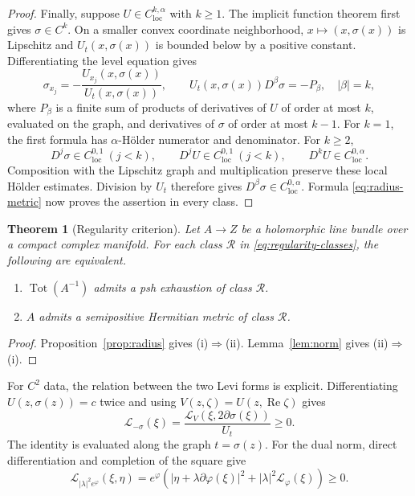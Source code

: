 \documentclass[11pt]{amsart}
\newtheorem{theorem}{Theorem}[section]
\theoremstyle{definition}
\theoremstyle{remark}
\numberwithin{equation}{section}
\newcommand{\Tot}{\operatorname{Tot}}
\newcommand{\Levi}{\mathcal L}
\begin{document}
\begin{proof}
Finally, suppose $U\in C^{k,\alpha}_{\mathrm{loc}}$ with $k\ge1$.
The implicit function theorem first gives $\sigma\in C^k$. On a smaller
convex coordinate neighborhood, $x\mapsto(x,\sigma(x))$ is
Lipschitz and $U_t(x,\sigma(x))$ is bounded below by a positive
constant. Differentiating the level equation gives
\[
 \sigma_{x_j}=-\frac{U_{x_j}(x,\sigma(x))}{U_t(x,\sigma(x))},
 \qquad
 U_t(x,\sigma(x))D^\beta\sigma=-P_\beta,
 \quad |\beta|=k,
\]
where $P_\beta$ is a finite sum of products of derivatives of $U$
of order at most $k$, evaluated on the graph, and derivatives of
$\sigma$ of order at most $k-1$. For $k=1$, the first formula
has $\alpha$-H\"older numerator and denominator. For $k\ge2$,
\[
 D^j\sigma\in C^{0,1}_{\mathrm{loc}}\ (j<k),\qquad
 D^jU\in C^{0,1}_{\mathrm{loc}}\ (j<k),\qquad
 D^kU\in C^{0,\alpha}_{\mathrm{loc}}.
\]
Composition with the Lipschitz graph and multiplication preserve
these local H\"older estimates. Division by $U_t$ therefore gives
$D^\beta\sigma\in C^{0,\alpha}_{\mathrm{loc}}$. Formula
\eqref{eq:radius-metric} now proves the
assertion in every class.
\end{proof}

\begin{samepage}
\begin{theorem}[Regularity criterion]\label{cor:criterion}\label{thm:regularity-criterion}
Let $A\to Z$ be a holomorphic line bundle over a compact complex
manifold. For each class $\mathcal R$ in
\eqref{eq:regularity-classes}, the following are equivalent.
\begin{enumerate}[label=\textup{(\roman*)},leftmargin=2.5em]
\item $\Tot(A^{-1})$ admits a psh exhaustion of class $\mathcal R$.
\item $A$ admits a semipositive Hermitian metric of class $\mathcal R$.
\end{enumerate}
\end{theorem}
\begin{proof}
Proposition~\ref{prop:radius} gives \textup{(i)}$\Rightarrow$\textup{(ii)}.
Lemma~\ref{lem:norm} gives \textup{(ii)}$\Rightarrow$\textup{(i)}.
\end{proof}
\end{samepage}

For $C^2$ data, the relation between the two Levi forms is explicit.
Differentiating $U(z,\sigma(z))=c$ twice and using
$V(z,\zeta)=U(z,\operatorname{Re}\zeta)$ gives
\begin{equation}\label{eq:radius-Levi}
 \Levi_{-\sigma}(\xi)
 =\frac{\Levi_V(\xi,2\partial\sigma(\xi))}{U_t}\ge0.
\end{equation}
The identity is evaluated along the graph $t=\sigma(z)$.
For the dual norm, direct differentiation and completion of the
square give
\[
 \Levi_{|\lambda|^2e^\varphi}(\xi,\eta)
 =e^\varphi\left(
    |\eta+\lambda\partial\varphi(\xi)|^2
    +|\lambda|^2\Levi_\varphi(\xi)\right)\ge0.
\]
\end{document}
